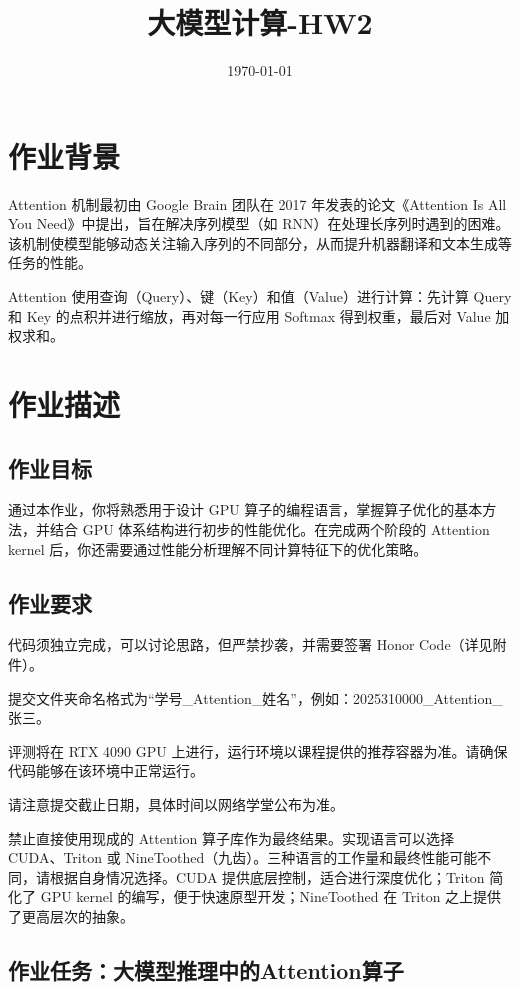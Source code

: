 \documentclass{article}
\title{大模型计算-HW2}
\date{\today}
\begin{document}
\maketitle

\section{作业背景}
Attention 机制最初由 Google Brain 团队在 2017 年发表的论文《Attention Is All You Need》中提出\cite{vaswani2017attention}，旨在解决序列模型（如 RNN）在处理长序列时遇到的困难。该机制使模型能够动态关注输入序列的不同部分，从而提升机器翻译和文本生成等任务的性能。

Attention 使用查询（Query）、键（Key）和值（Value）进行计算：先计算 Query 和 Key 的点积并进行缩放，再对每一行应用 Softmax 得到权重，最后对 Value 加权求和。

\section{作业描述}
\subsection{作业目标}
通过本作业，你将熟悉用于设计 GPU 算子的编程语言，掌握算子优化的基本方法，并结合 GPU 体系结构进行初步的性能优化。在完成两个阶段的 Attention kernel 后，你还需要通过性能分析理解不同计算特征下的优化策略。

\subsection{作业要求}
代码须独立完成，可以讨论思路，但严禁抄袭，并需要签署 Honor Code（详见附件）。

提交文件夹命名格式为“学号\_Attention\_姓名”，例如：2025310000\_Attention\_张三。

评测将在 RTX 4090 GPU 上进行，运行环境以课程提供的推荐容器为准。请确保代码能够在该环境中正常运行。

请注意提交截止日期，具体时间以网络学堂公布为准。

禁止直接使用现成的 Attention 算子库作为最终结果。实现语言可以选择 CUDA、Triton 或 NineToothed（九齿）。三种语言的工作量和最终性能可能不同，请根据自身情况选择。CUDA 提供底层控制，适合进行深度优化；Triton 简化了 GPU kernel 的编写，便于快速原型开发；NineToothed 在 Triton 之上提供了更高层次的抽象。

\subsection{作业任务：大模型推理中的Attention算子}
\end{document}
